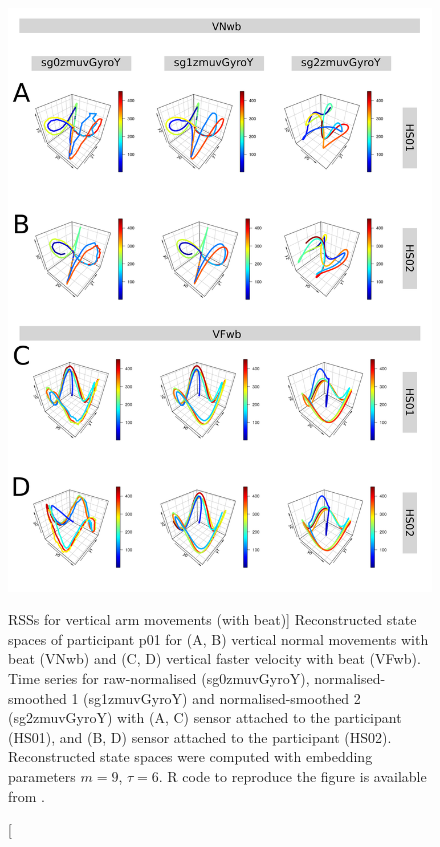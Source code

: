 \begin{figure}
\centering
\includegraphics[height=0.8\textheight]{rss_Vwb_w500}
\caption
	[RSSs for vertical arm movements (with beat)]{
	Reconstructed state spaces of participant p01 for 
	(A, B) vertical normal movements with beat (VNwb) and 
	(C, D) vertical faster velocity with beat (VFwb).
	Time series for raw-normalised (sg0zmuvGyroY), 
	normalised-smoothed 1 (sg1zmuvGyroY) and 
	normalised-smoothed 2 (sg2zmuvGyroY) with
	(A, C) sensor attached to the participant (HS01), and
	(B, D) sensor attached to the participant (HS02).	
	Reconstructed state spaces were computed with 
	embedding parameters $m=9$, $\tau=6$.
	R code to reproduce the figure is available from \cite{hwum2018}.
        }
     \label{fig:rss_Vwb_w500}
\end{figure}



